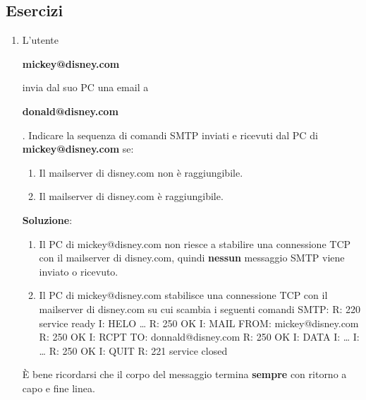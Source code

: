 \documentclass[11pt,a4paper,oneside]{book}
\theoremstyle{definition}
\begin{document}
\pagebreak

\subsection{Esercizi}
\begin{enumerate}
	\item L’utente \begin{center}
		      \textbf{mickey@disney.com}
	      \end{center} invia dal suo PC una email a \begin{center}
		      \textbf{donald@disney.com}
	      \end{center}. Indicare la sequenza di comandi SMTP inviati e ricevuti dal PC di \textbf{mickey@disney.com} se:
	      \begin{enumerate}
		      \item Il mailserver di disney.com non è raggiungibile.
		      \item Il mailserver di disney.com è raggiungibile.
	      \end{enumerate}
	      \textbf{Soluzione}:
	      \begin{enumerate}
		      \item Il PC di mickey@disney.com non riesce a stabilire una connessione TCP con il mailserver di disney.com, quindi \textbf{nessun} messaggio SMTP viene inviato o ricevuto.
		      \item  Il PC di mickey@disney.com stabilisce una connessione TCP con il mailserver di
		            disney.com su cui scambia i seguenti comandi SMTP:\newline
		            R: 220 service ready \newline
		            I: HELO …\newline
		            R: 250 OK\newline
		            I: MAIL FROM: mickey@disney.com\newline
		            R: 250 OK \newline
		            I: RCPT TO: donnald@disney.com\newline
		            R: 250 OK \newline
		            I: DATA\newline
		            I: …\newline
		            I: …\newline
		            R: 250 OK\newline
		            I: QUIT\newline
		            R: 221 service closed\newline
	      \end{enumerate}
	      È bene ricordarsi che il corpo del messaggio termina \textbf{sempre} con ritorno a capo e fine linea.


\end{enumerate}
\end{document}
